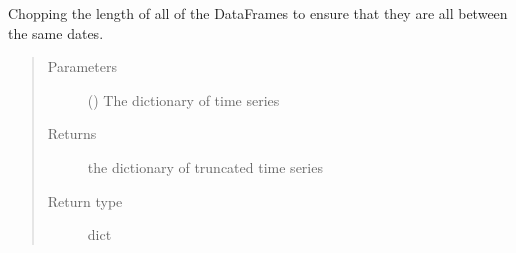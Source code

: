 \documentclass[letterpaper,10pt,english]{sphinxmanual}
\begin{document}

\begin{fulllineitems}
\label{\detokenize{preprocessing:Foresight.preprocessing.truncate_window_length}}
Chopping the length of all of the DataFrames to ensure
that they are all between the same dates.
\begin{quote}\begin{description}
\item[{Parameters}] \leavevmode
{} () \textendash{} The dictionary of time series

\item[{Returns}] \leavevmode
the dictionary of truncated time series

\item[{Return type}] \leavevmode
dict

\end{description}\end{quote}

\end{fulllineitems}

\end{document}
